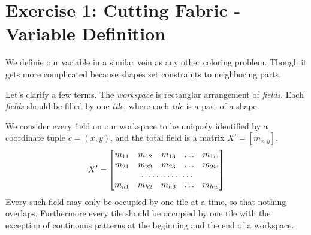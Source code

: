 \documentclass{../base/base}
\begin{document}



\section*{Exercise 1: Cutting Fabric - Variable Definition}

We definie our variable in a similar vein as any other coloring problem. Though it gets more complicated because shapes set constraints to neighboring parts.


Let's clarify a few terms. The \textit{workspace} is rectanglar arrangement of \textit{fields}. Each \textit{fields} should be filled by one \textit{tile}, where each \textit{tile} is a part of a shape.

We consider every field on our workspace to be uniquely identified by a coordinate tuple $c = (x,y)$, and the total field is a matrix $X'=[m_{x,y}]$.
\[
X'=
\begin{bmatrix}
    m_{11}       & m_{12} & m_{13} & \dots & m_{1w} \\
    m_{21}       & m_{22} & m_{23} & \dots & m_{2w} \\
    \hdotsfor{5} \\
    m_{h1}       & m_{h2} & m_{h3} & \dots & m_{hw}
\end{bmatrix}
\]
Every such field may only be occupied by one tile at a time, so that nothing overlaps. Furthermore every tile should be occupied by one tile with the exception of continouus patterns at the beginning and the end of a workspace.
\end{document}
